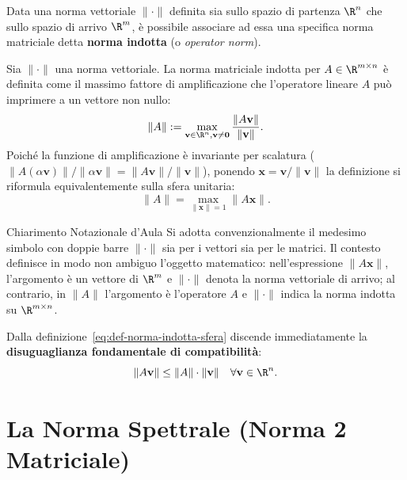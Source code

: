 Data una norma vettoriale $\|\cdot\|$ definita sia sullo spazio di partenza $\R^n$ che sullo spazio di arrivo $\R^m$, \`e possibile associare ad essa una specifica norma matriciale detta \textbf{norma indotta} (o \textit{operator norm}).

\begin{definition}
Sia $\|\cdot\|$ una norma vettoriale. La norma matriciale indotta per $A \in \R^{m \times n}$ \`e definita come il massimo fattore di amplificazione che l'operatore lineare $A$ pu\`o imprimere a un vettore non nullo:
\begin{equation}
    \|A\| := \max_{\mathbf{v} \in \R^n, \mathbf{v} \neq \mathbf{0}} \frac{\|A\mathbf{v}\|}{\|\mathbf{v}\|}.
\end{equation}
Poich\'e la funzione di amplificazione \`e invariante per scalatura ($\|A(\alpha \mathbf{v})\| / \|\alpha \mathbf{v}\| = \|A\mathbf{v}\|/\|\mathbf{v}\|$), ponendo $\mathbf{x} = \mathbf{v} / \|\mathbf{v}\|$ la definizione si riformula equivalentemente sulla sfera unitaria:
\begin{equation}
    \label{eq:def-norma-indotta-sfera}
    \|A\| = \max_{\|\mathbf{x}\| = 1} \|A\mathbf{x}\|.
\end{equation}
\end{definition}

\begin{noteblock}{Chiarimento Notazionale d'Aula}
Si adotta convenzionalmente il medesimo simbolo con doppie barre $\|\cdot\|$ sia per i vettori sia per le matrici. Il contesto definisce in modo non ambiguo l'oggetto matematico: nell'espressione $\|A\mathbf{x}\|$, l'argomento \`e un vettore di $\R^m$ e $\|\cdot\|$ denota la norma vettoriale di arrivo; al contrario, in $\|A\|$ l'argomento \`e l'operatore $A$ e $\|\cdot\|$ indica la norma indotta su $\R^{m \times n}$.
\end{noteblock}

Dalla definizione~\eqref{eq:def-norma-indotta-sfera} discende immediatamente la \textbf{disuguaglianza fondamentale di compatibilit\`a}:
\begin{equation}
    \|A\mathbf{v}\| \le \|A\| \cdot \|\mathbf{v}\| \quad \forall \mathbf{v} \in \R^n.
\end{equation}

\FloatBarrier
\section{La Norma Spettrale (Norma 2 Matriciale)}
\label{sec:norma-spettrale}

